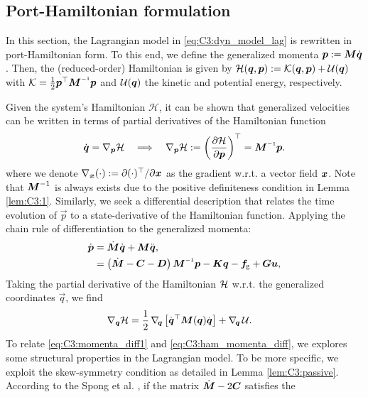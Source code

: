 \subsection{Port-Hamiltonian formulation}
In this section, the Lagrangian model in \eqref{eq:C3:dyn_model_lag} is rewritten in port-Hamiltonian form. To this end, we define the generalized momenta $\boldsymbol{p} := \boldsymbol{M} \dot{\boldsymbol{q}}$. Then, the (reduced-order) Hamiltonian is given by $\mathcal{H}(\boldsymbol{q},\boldsymbol{p}) := \mathcal{K}(\boldsymbol{q},\boldsymbol{p}) + \mathcal{U}(\boldsymbol{q})$ with $\Kf = \frac{1}{2} \vec{p}^\top \mat{M}\inv \vec{p}$ and $\mathcal{U}(\boldsymbol{q})$ the kinetic and potential energy, respectively.

Given the system's Hamiltonian $\mathcal{H}$, it can be shown that generalized velocities can be written in terms of partial derivatives of the Hamiltonian function
%
\begin{equation}
\dot{\vec{q}} = \nabla_{\vec{p}} \Hm \quad \Longrightarrow  \quad \nabla_{\vec{p}} \Hm := \left(\frac{\p \Hm}{\p \pB} \right)^\top= \mat{M}\inv \vec{p}.
\label{eq:C3:state_diff}
\end{equation}
%
where we denote $\nabla_{{\boldsymbol{x}}}(\cdot) := \partial (\cdot)^\top/\partial {\boldsymbol{x}}$ as the gradient w.r.t. a vector field ${\boldsymbol{x}}$. Note that $\boldsymbol{M}^{-1}$ is always exists due to the positive definiteness condition in Lemma \ref{lem:C3:1}. Similarly, we seek a differential description that relates the time evolution of $\vec{p}$ to a state-derivative of the Hamiltonian function. Applying the chain rule of differentiation to the generalized momenta:
%
\begin{align}
\dot{\vec{p}} & = \dot{\mat{M}}\dot{\vec{q}} + \mat{M}\ddot{\vec{q}},\notag \\
& = \left(\dot{\mat{M}} - \mat{C} - \mat{D} \right) \mat{M}\inv \vec{p} - \vec{Kq} - \vec{f}\!\grav + \vec{Gu}
\label{eq:C3:momenta_diff1},
\end{align}
%
Taking the partial derivative of the Hamiltonian $\mathcal{H}$ w.r.t. the generalized coordinates $\vec{q}$, we find
\begin{align}
\nabla_{\boldsymbol{q}} \mathcal{H} & = \frac{1}{2} \,\nabla_{\!{\boldsymbol{q}}} \left[ \dot{\boldsymbol{q}}^\top \boldsymbol{M}(\boldsymbol{q}) \dot{\boldsymbol{q}} \right] + \nabla_{\!\boldsymbol{q}}\, \mathcal{U}.
\label{eq:C3:ham_momenta_diff}
\end{align}
%
To relate \eqref{eq:C3:momenta_diff1} and \eqref{eq:C3:ham_momenta_diff}, we explores some structural properties in the Lagrangian model. To be more specific, we exploit the skew-symmetry condition as detailed in Lemma \ref{lem:C3:passive}. According to the Spong et al. \cite{Spong2006}, if the matrix $\dot{\boldsymbol{M}} - 2\boldsymbol{C}$ satisfies the
